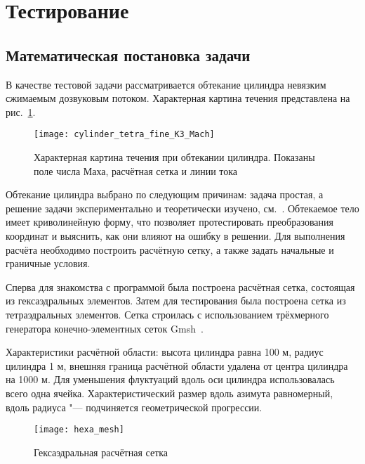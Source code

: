 \section{Тестирование}

\subsection{Математическая постановка задачи}

В качестве тестовой задачи рассматривается обтекание цилиндра невязким сжимаемым дозвуковым потоком. Характерная картина течения представлена на рис.~\ref{pic:result:mach}.

\begin{figure}[ht]
	\centering
	\texttt{[image: cylinder\_tetra\_fine\_K3\_Mach]}
	\caption{Характерная картина течения при обтекании цилиндра. Показаны поле числа Маха, расчётная сетка и линии тока}
	\label{pic:result:mach}
\end{figure}

Обтекание цилиндра выбрано по следующим причинам: задача простая, а решение задачи экспериментально и теоретически изучено, см.~\cite{CylynderFlow:1994:en}. Обтекаемое тело имеет криволинейную форму, что позволяет протестировать преобразования координат и выяснить, как они влияют на ошибку в решении. Для выполнения расчёта необходимо построить расчётную сетку, а также задать начальные и граничные условия.

Сперва для знакомства с программой была построена расчётная сетка, состоящая из гексаэдральных элементов. Затем для тестирования была построена сетка из тетраэдральных элементов. Сетка строилась с использованием трёхмерного генератора конечно-элементных сеток Gmsh~\cite{Gmsh}.

Характеристики расчётной области: высота цилиндра равна 100 м, радиус цилиндра 1 м, внешняя граница расчётной области удалена от центра цилиндра на 1000 м. Для уменьшения флуктуаций вдоль оси цилиндра использовалась всего одна ячейка. Характеристический размер вдоль азимута равномерный, вдоль радиуса "--- подчиняется геометрической прогрессии.

\begin{figure}[h]
	\centering
	\texttt{[image: hexa\_mesh]}
	\caption{Гексаэдральная расчётная сетка}
	\label{pic:hexamesh}
\end{figure}

